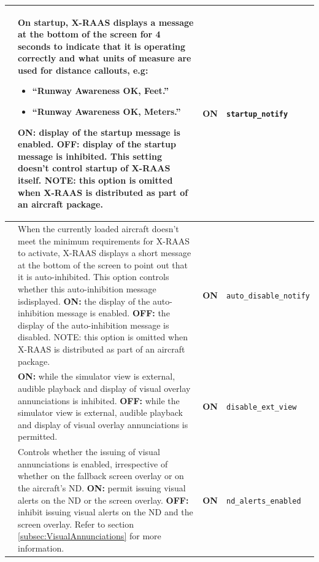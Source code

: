 \documentclass[a4paper,12pt]{article}
\newcommand{\confopt}[1]{\texttt{#1}}
\begin{document}
{\begin{center}
\begin{supertabular}{|c|p{8cm}|c|l|}
\hline

 &
On startup, X-RAAS displays a message at the bottom of the screen for 4
seconds to indicate that it is operating correctly and what units of
measure are used for distance callouts, e.g:
\begin{itemize}
\item ``Runway Awareness OK, Feet.''
\item ``Runway Awareness OK, Meters.''
\end{itemize}
\textbf{ON:} display of the startup message is enabled.\newline
\textbf{OFF:} display of the startup message is inhibited.\newline
This setting doesn't control startup of X-RAAS itself.\newline
NOTE: this option is omitted when X-RAAS is distributed as part of an
aircraft package. & \textbf{ON} &
\confopt{startup\_notify} \\

\hline

 &
When the currently loaded aircraft doesn't meet the minimum requirements
for X-RAAS to activate, X-RAAS displays a short message at the bottom of
the screen to point out that it is auto-inhibited. This option controls
whether this auto-inhibition message isdisplayed.\newline
\textbf{ON:} the display of the auto-inhibition message is enabled.\newline
\textbf{OFF:} the display of the auto-inhibition message is disabled.\newline
NOTE: this option is omitted when X-RAAS is distributed as part of an
aircraft package. &
\textbf{ON} & \confopt{auto\_disable\_notify} \\

\hline

 &
\textbf{ON:} while the simulator view is external, audible playback and
display of visual overlay annunciations is inhibited.\newline
\textbf{OFF:} while the simulator view is external, audible playback and
display of visual overlay annunciations is permitted. & \textbf{ON} &
\confopt{disable\_ext\_view} \\

\hline

 &
Controls whether the issuing of visual annunciations is enabled,
irrespective of whether on the fallback screen overlay or on the
aircraft's ND.\newline
\textbf{ON:} permit issuing visual alerts on the ND or the screen
overlay.\newline
\textbf{OFF:} inhibit issuing visual alerts on the ND and the screen
overlay.\newline
Refer to section \ref{subsec:VisualAnnunciations} for more information. &
\textbf{ON} & \confopt{nd\_alerts\_enabled} \\


\end{supertabular}
\end{center}}
\end{document}
